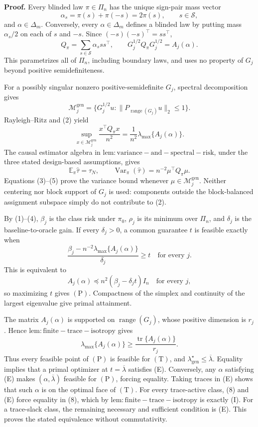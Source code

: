 \textbf{Proof.}
Every blinded law \(\pi\in\Pi_n\) has the unique sign-pair mass vector
\[
\alpha_s=\pi(s)+\pi(-s)=2\pi(s),
\qquad s\in\mathscr S,
\tag{1}
\]
and \(\alpha\in\Delta_m\). Conversely, every \(\alpha\in\Delta_m\) defines a blinded law by putting mass \(\alpha_s/2\) on each of \(s\) and \(-s\).  Since \((-s)(-s)^\top=ss^\top\),
\[
Q_\pi=\sum_{s\in\mathscr S}\alpha_sss^\top,
\qquad
G_j^{1/2}Q_\pi G_j^{1/2}=A_j(\alpha).
\tag{2}
\]
This parametrizes all of \(\Pi_n\), including boundary laws, and uses no property of \(G_j\) beyond positive semidefiniteness.

For a possibly singular nonzero positive-semidefinite \(G_j\), spectral decomposition gives
\[
\mathcal M_j^{\mathrm{gen}}
=\{G_j^{1/2}u:\|P_{\operatorname{range}(G_j)}u\|_2\le1\}.
\tag{3}
\]
Rayleigh--Ritz and (2) yield
\[
\sup_{x\in\mathcal M_j^{\mathrm{gen}}}\frac{x^\top Q_\pi x}{n^2}
=\frac1{n^2}\lambda_{\max}\{A_j(\alpha)\}.
\tag{4}
\]
The causal estimator algebra in \(\mathrm{lem:variance-and-spectral-risk}\), under the three stated design-based assumptions, gives
\[
\mathbb E_\pi\widehat\tau=\tau_N,
\qquad
\operatorname{Var}_\pi(\widehat\tau)=n^{-2}\mu^\top Q_\pi\mu.
\tag{5}
\]
Equations (3)--(5) prove the variance bound whenever \(\mu\in\mathcal M_j^{\mathrm{gen}}\).  Neither centering nor block support of \(G_j\) is used: components outside the block-balanced assignment subspace simply do not contribute to (2).

By (1)--(4), \(\beta_j\) is the class risk under \(\pi_0\), \(\rho_j\) is its minimum over \(\Pi_n\), and \(\delta_j\) is the baseline-to-oracle gain.  If every \(\delta_j>0\), a common guarantee \(t\) is feasible exactly when
\[
\frac{\beta_j-n^{-2}\lambda_{\max}\{A_j(\alpha)\}}{\delta_j}\ge t
\quad\text{for every }j.
\tag{6}
\]
This is equivalent to
\[
A_j(\alpha)\preceq n^2(\beta_j-\delta_jt)I_n
\quad\text{for every }j,
\tag{7}
\]
so maximizing \(t\) gives \((\mathrm P)\). Compactness of the simplex and continuity of the largest eigenvalue give primal attainment.

The matrix \(A_j(\alpha)\) is supported on \(\operatorname{range}(G_j)\), whose positive dimension is \(r_j\).  Hence \(\mathrm{lem:finite-trace-isotropy}\) gives
\[
\lambda_{\max}\{A_j(\alpha)\}
\ge\frac{\operatorname{tr}\{A_j(\alpha)\}}{r_j}.
\tag{8}
\]
Thus every feasible point of \((\mathrm P)\) is feasible for \((\mathrm T)\), and \(\lambda_{\mathrm{gen}}^\star\le\overline\lambda\).  Equality implies that a primal optimizer at \(t=\overline\lambda\) satisfies (E). Conversely, any \(\alpha\) satisfying (E) makes \((\alpha,\overline\lambda)\) feasible for \((\mathrm P)\), forcing equality. Taking traces in (E) shows that such \(\alpha\) is on the optimal face of \((\mathrm T)\). For every trace-active class, (8) and (E) force equality in (8), which by \(\mathrm{lem:finite-trace-isotropy}\) is exactly (I). For a trace-slack class, the remaining necessary and sufficient condition is (E). This proves the stated equivalence without commutativity.

